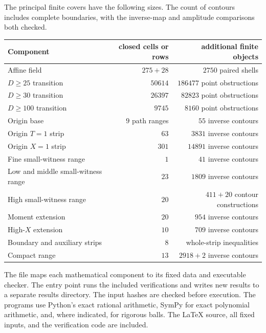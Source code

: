 The principal finite covers have the following sizes.
The count of contours includes complete boundaries, with
the inverse-map and amplitude comparisons both checked.
\begin{center}\small
\begin{tabular}{lrr}
\toprule
Component&closed cells or rows&additional finite objects\\
\midrule
Affine field&$275+28$&$2750$ paired shells\\
$D\ge25$ transition&$50614$&$186477$ point obstructions\\
$D\ge30$ transition&$26397$&$82823$ point obstructions\\
$D\ge100$ transition&$9745$&$8160$ point obstructions\\
Origin base&$9$ path ranges&$55$ inverse contours\\
Origin $T=1$ strip&$63$&$3831$ inverse contours\\
Origin $X=1$ strip&$301$&$14891$ inverse contours\\
Fine small-witness range&$1$&$41$ inverse contours\\
Low and middle small-witness range&$23$&$1809$ inverse contours\\
High small-witness range&$20$&$411+20$ contour constructions\\
Moment extension&$20$&$954$ inverse contours\\
High-$X$ extension&$10$&$709$ inverse contours\\
Boundary and auxiliary strips&$8$&whole-strip inequalities\\
Compact range&$13$&$2918+2$ inverse contours\\
\bottomrule
\end{tabular}
\end{center}

The file  maps each mathematical
component to its fixed data and executable checker. The entry
point  runs the included
verifications and writes new results to a separate results
directory. The input hashes are checked before execution.
The programs use Python's exact rational arithmetic, SymPy
for exact polynomial arithmetic, and, where indicated,
 for rigorous balls.
The LaTeX source, all fixed inputs, and the verification code are included.

